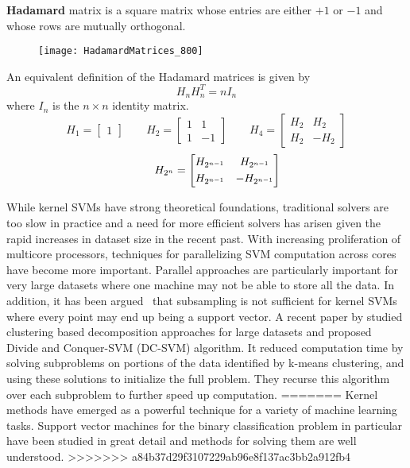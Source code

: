 	\textbf{Hadamard} matrix is a square matrix whose entries are either $+1$ or $-1$ and whose rows are mutually orthogonal.
\begin{figure}[h]
\centering
\texttt{[image: HadamardMatrices\_800]}
\caption{}
\label{fig:HadamardMatrices_800}
\end{figure}


	An equivalent definition of the Hadamard matrices is given by 
	$$ H_{n} H_{n}^T = n  I_{n} $$
	where $I_{n}$ is the $n \times n$ identity matrix.
	$$
	H_{1} = \begin{bmatrix}
	1
	\end{bmatrix}
	\qquad
	H_{2} = \begin{bmatrix}
	1 & 1           \\[0.3em]
	1& -1
	\end{bmatrix}	
	\qquad
	H_{4} = \begin{bmatrix}
	H_{2} & H_{2}           \\[0.3em]
	H_{2}& -H_{2}
	\end{bmatrix}	
	$$
	$$
	\centering
	\qquad
	H_{2^{n}} = \begin{bmatrix}
	H_{2^{n-1}} & H_{2^{n-1}}           \\[0.3em]
	H_{2^{n-1}}& -H_{2^{n-1}}            
	\end{bmatrix}	
	$$




 
While kernel SVMs have strong theoretical foundations, traditional solvers are too slow in practice and a need for more efficient solvers has arisen given the rapid increases in dataset size in the recent past. With increasing proliferation of multicore processors, techniques for parallelizing SVM computation across cores have become more important. Parallel approaches are particularly important for very large datasets where one machine may not be able to store all the data. In addition, it has been argued~\cite{brugger2006parallel} that subsampling is not sufficient for kernel SVMs where every point may end up being a support vector. A recent paper by \cite{hsieh2013divide} studied clustering based decomposition approaches for large datasets and proposed Divide and Conquer-SVM (DC-SVM) algorithm. It reduced computation time by solving subproblems on portions of the data identified by k-means clustering, and using these solutions to initialize the full problem. They recurse this algorithm over each subproblem to further speed up computation. 
=======
Kernel methods have emerged as a powerful technique for a variety of machine learning tasks. 
Support vector machines for the binary classification problem in particular have been studied in great detail and methods for solving them are well understood. 
>>>>>>> a84b37d29f3107229ab96e8f137ac3bb2a912fb4

